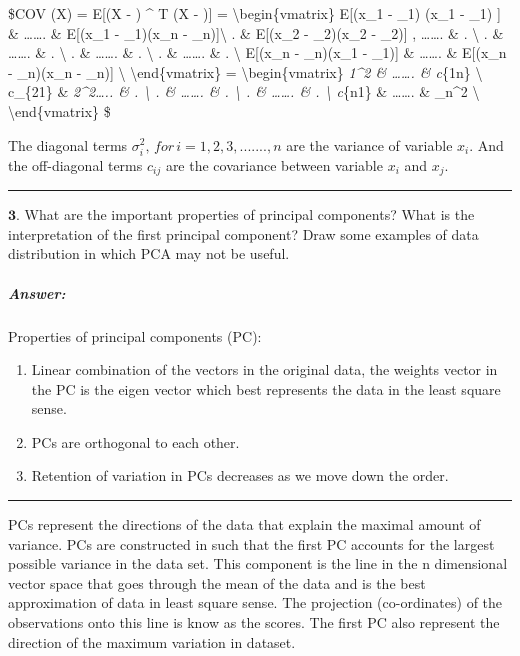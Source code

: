 \documentclass[11pt]{article}
\begin{document}
\$COV (X) = E{[}(X - \mu) \^{} T (X - \mu){]} =
\textbackslash{}begin\{vmatrix\} E{[}(x\_1 - \mu\_1) (x\_1 - \mu\_1) {]}
\& \ldots{}\ldots{}. \& E{[}(x\_1 - \mu\_1)(x\_n -
\mu\_n){]}\textbackslash{} . \& E{[}(x\_2 - \mu\_2)(x\_2 - \mu\_2){]} ,
\ldots{}\ldots{}. \& . \textbackslash{} . \& \ldots{}\ldots{}. \& .
\textbackslash{} . \& \ldots{}\ldots{}. \& . \textbackslash{} . \&
\ldots{}\ldots{}. \& . \textbackslash{} E{[}(x\_n - \mu\_n)(x\_1 -
\mu\_1){]} \& \ldots{}\ldots{}. \& E{[}(x\_n - \mu\_n)(x\_n - \mu\_n){]}
\textbackslash{} \textbackslash{}end\{vmatrix\} =
\textbackslash{}begin\{vmatrix\} \sigma\emph{1\^{}2 \& \ldots{}\ldots{}.
\& c}\{1n\} \textbackslash{} c\_\{21\} \& \sigma\emph{2\^{}2\ldots{}..
\& . \textbackslash{} . \& \ldots{}\ldots{}. \& . \textbackslash{} . \&
\ldots{}\ldots{}. \& . \textbackslash{} c}\{n1\} \& \ldots{}\ldots{}. \&
\sigma\_n\^{}2 \textbackslash{} \textbackslash{}end\{vmatrix\} \$

The diagonal terms \(\sigma_i ^ 2, \, for \, i=1,2,3,.......,n\) are the
variance of variable \(x_i\). And the off-diagonal terms \(c_{ij}\) are
the covariance between variable \(x_i\) and \(x_j\).

    \begin{center}\rule{0.5\linewidth}{\linethickness}\end{center}
\newpage
\(\textbf{3.}\) What are the important properties of principal
components? What is the interpretation of the first principal component?
Draw some examples of data distribution in which PCA may not be useful.

    \hypertarget{answer}{%
\subparagraph{Answer:}\label{answer}}

Properties of principal components (PC):

\begin{enumerate}
\def\labelenumi{\arabic{enumi})}
\item
  Linear combination of the vectors in the original data, the weights
  vector in the PC is the eigen vector which best represents the data in
  the least square sense.
\item
  PCs are orthogonal to each other.
\item
  Retention of variation in PCs decreases as we move down the order.
\end{enumerate}

\begin{center}\rule{0.5\linewidth}{\linethickness}\end{center}

PCs represent the directions of the data that explain the maximal amount
of variance. PCs are constructed in such that the first PC accounts for
the largest possible variance in the data set. This component is the
line in the n dimensional vector space that goes through the mean of the
data and is the best approximation of data in least square sense. The
projection (co-ordinates) of the observations onto this line is know as
the scores. The first PC also represent the direction of the maximum
variation in dataset.
\end{document}
